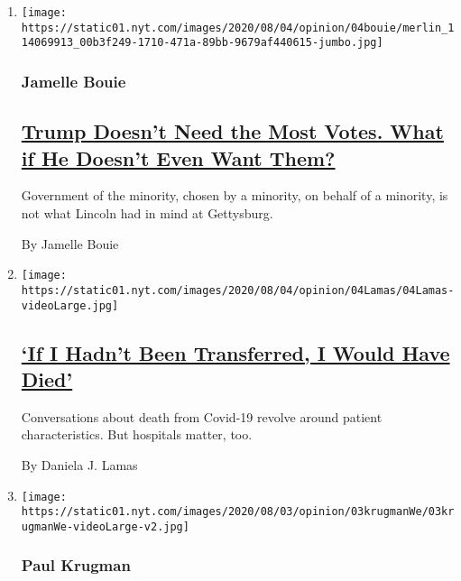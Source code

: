 \begin{enumerate}
\def\labelenumi{\arabic{enumi}.}
\item
  \texttt{[image: https://static01.nyt.com/images/2020/08/04/opinion/04bouie/merlin\_114069913\_00b3f249-1710-471a-89bb-9679af440615-jumbo.jpg]}

  \hypertarget{jamelle-bouie}{%
  \subsubsection{Jamelle Bouie}\label{jamelle-bouie}}

  \hypertarget{trump-doesnt-need-the-most-votes-what-if-he-doesnt-even-want-them}{%
  \subsection{\texorpdfstring{\href{/2020/08/04/opinion/trump-2020-electoral-college.html}{Trump
  Doesn't Need the Most Votes. What if He Doesn't Even Want
  Them?}}{Trump Doesn't Need the Most Votes. What if He Doesn't Even Want Them?}}\label{trump-doesnt-need-the-most-votes-what-if-he-doesnt-even-want-them}}

  Government of the minority, chosen by a minority, on behalf of a
  minority, is not what Lincoln had in mind at Gettysburg.

  By Jamelle Bouie
\item
  \texttt{[image: https://static01.nyt.com/images/2020/08/04/opinion/04Lamas/04Lamas-videoLarge.jpg]}

  \hypertarget{if-i-hadnt-been-transferred-i-would-have-died}{%
  \subsection{\texorpdfstring{\href{/2020/08/04/opinion/covid-rural-hospitals.html}{`If
  I Hadn't Been Transferred, I Would Have
  Died'}}{`If I Hadn't Been Transferred, I Would Have Died'}}\label{if-i-hadnt-been-transferred-i-would-have-died}}

  Conversations about death from Covid-19 revolve around patient
  characteristics. But hospitals matter, too.

  By Daniela J. Lamas
\item
  \texttt{[image: https://static01.nyt.com/images/2020/08/03/opinion/03krugmanWe/03krugmanWe-videoLarge-v2.jpg]}

  \hypertarget{paul-krugman}{%
  \subsubsection{Paul Krugman}\label{paul-krugman}}


\end{enumerate}
